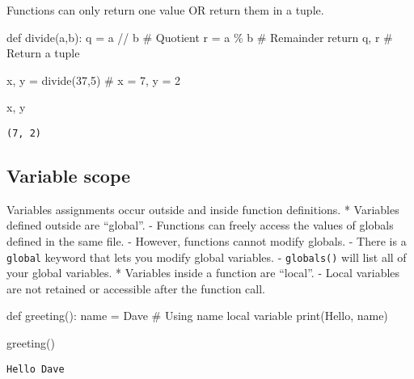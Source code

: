 \documentclass[
  letterpaper,
  DIV=11,
  numbers=noendperiod]{scrreprt}
\newenvironment{Shaded}{\begin{snugshade}}{\end{snugshade}}
\newcommand{\BuiltInTok}[1]{\textcolor[rgb]{0.00,0.46,0.62}{#1}}
\newcommand{\CommentTok}[1]{\textcolor[rgb]{0.37,0.37,0.37}{#1}}
\newcommand{\ControlFlowTok}[1]{\textcolor[rgb]{0.00,0.46,0.62}{#1}}
\newcommand{\DecValTok}[1]{\textcolor[rgb]{0.68,0.00,0.00}{#1}}
\newcommand{\KeywordTok}[1]{\textcolor[rgb]{0.00,0.46,0.62}{#1}}
\newcommand{\NormalTok}[1]{\textcolor[rgb]{0.00,0.46,0.62}{#1}}
\newcommand{\OperatorTok}[1]{\textcolor[rgb]{0.37,0.37,0.37}{#1}}
\newcommand{\StringTok}[1]{\textcolor[rgb]{0.13,0.47,0.30}{#1}}
\begin{document}
Functions can only return one value OR return them in a tuple.

\begin{Shaded}
\begin{Highlighting}[]
\KeywordTok{def}\NormalTok{ divide(a,b):}
\NormalTok{    q }\OperatorTok{=}\NormalTok{ a }\OperatorTok{//}\NormalTok{ b      }\CommentTok{\# Quotient}
\NormalTok{    r }\OperatorTok{=}\NormalTok{ a }\OperatorTok{\%}\NormalTok{ b       }\CommentTok{\# Remainder}
    \ControlFlowTok{return}\NormalTok{ q, r     }\CommentTok{\# Return a tuple}

\NormalTok{x, y }\OperatorTok{=}\NormalTok{ divide(}\DecValTok{37}\NormalTok{,}\DecValTok{5}\NormalTok{) }\CommentTok{\# x = 7, y = 2}

\NormalTok{x, y}
\end{Highlighting}
\end{Shaded}

\begin{verbatim}
(7, 2)
\end{verbatim}

\hypertarget{variable-scope}{%
\subsection{Variable scope}\label{variable-scope}}

Variables assignments occur outside and inside function definitions. *
Variables defined outside are ``global''. - Functions can freely access
the values of globals defined in the same file. - However, functions
cannot modify globals. - There is a \texttt{global} keyword that lets
you modify global variables. - \texttt{globals()} will list all of your
global variables. * Variables inside a function are ``local''. - Local
variables are not retained or accessible after the function call.

\begin{Shaded}
\begin{Highlighting}[]
\KeywordTok{def}\NormalTok{ greeting():}
\NormalTok{    name }\OperatorTok{=} \StringTok{\textquotesingle{}Dave\textquotesingle{}} \CommentTok{\# Using \textasciigrave{}name\textasciigrave{} local variable}
    \BuiltInTok{print}\NormalTok{(}\StringTok{\textquotesingle{}Hello\textquotesingle{}}\NormalTok{, name)  }
    
\NormalTok{greeting()}
\end{Highlighting}
\end{Shaded}

\begin{verbatim}
Hello Dave
\end{verbatim}
\end{document}
